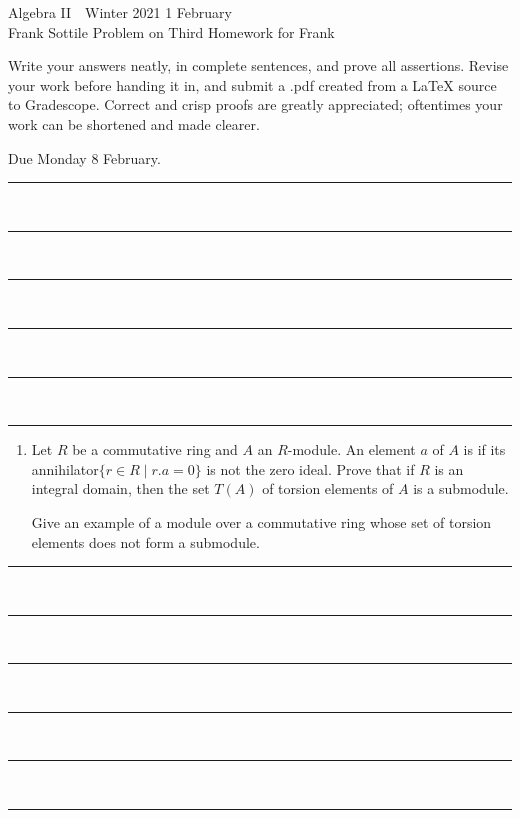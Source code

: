 \documentclass[12pt]{article}
\newcommand{\barsl}{\noindent\begin{minipage}[t]{575pt}
{\color{violet}\rule{575pt}{1.2pt}}\vspace{-5.7mm}\\
{\color{blue}\rule{575pt}{1.2pt}}\vspace{-5.7mm}\\
{\color{green}\rule{575pt}{1.2pt}}\vspace{-5.7mm}\\
{\color{yellow}\rule{575pt}{1.2pt}}\vspace{-5.7mm}\\
{\color{orange}\rule{575pt}{1.2pt}}\vspace{-5.7mm}\\
{\color{red}\rule{575pt}{1.2pt}}
\end{minipage}}
\def\demph#1{{\color{blue}{\sl #1}}}
\def\defcolor#1{{\color{blue}#1}}
\begin{document}
\LARGE 
\noindent
Algebra II\ \ Winter 2021 \hfill 1 February\makebox[40pt][l]{\ }\\
Frank Sottile \hfill
\Large\sf
Problem on Third Homework for Frank\makebox[40pt][l]{\ }\\
\large\vspace{5pt}

\noindent
Write your answers neatly, in complete sentences, and prove all assertions.  
Revise your work before handing it in, and submit a .pdf  created from a LaTeX source to Gradescope.
Correct and crisp proofs are greatly appreciated; oftentimes your work can be shortened and made clearer.\newline

{\color{red}Due Monday 8 February.}\vspace{-5pt}\newline


%
\barsl\vspace{2pt}

\normalsize
\noindent{\color{brown}{\sf For Frank to grade:}}

\begin{enumerate}


 \item Let $R$ be a commutative ring and $A$ an $R$-module.
   An element $a$ of $A$ is \demph{torsion} if its annihilator\newline $\{r\in R\mid r.a=0\}$ is not the zero ideal.
   Prove that if $R$ is an integral domain, then the set \defcolor{$T(A)$} of torsion elements of $A$ is a submodule.

   Give an example of a module over a commutative ring whose set of torsion elements does not form a submodule.\vspace{-2pt}

\end{enumerate}

\barsl
\end{document}
